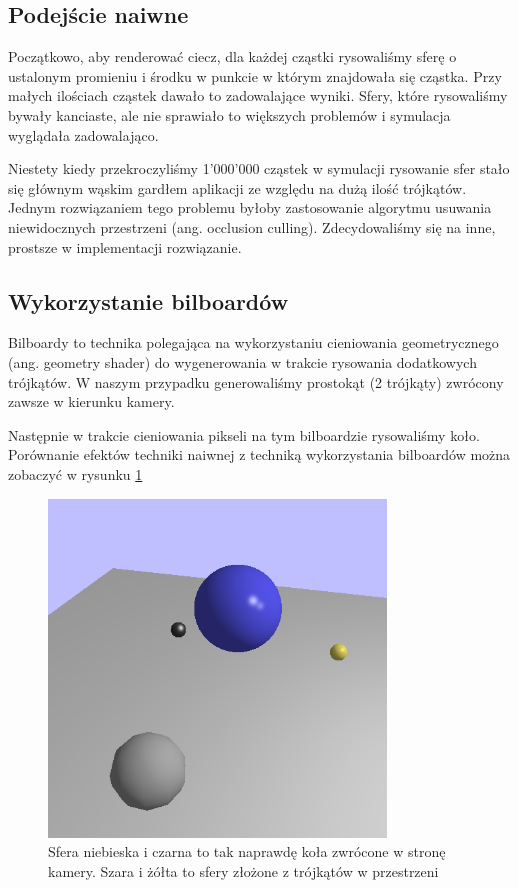 \documentclass[polish, 12pt]{aghthesis}
\begin{document}
	\subsection{Podejście naiwne}
		Początkowo, aby renderować ciecz, dla każdej cząstki rysowaliśmy sferę o ustalonym promieniu i środku w punkcie w którym znajdowała się cząstka. Przy małych ilościach cząstek dawało to zadowalające wyniki. Sfery, które rysowaliśmy bywały kanciaste, ale nie sprawiało to większych problemów i symulacja wyglądała zadowalająco.
		
		Niestety kiedy przekroczyliśmy 1'000'000 cząstek w symulacji rysowanie sfer stało się głównym wąskim gardłem aplikacji ze względu na dużą ilość trójkątów. Jednym rozwiązaniem tego problemu byłoby zastosowanie algorytmu usuwania niewidocznych przestrzeni (ang. occlusion culling). Zdecydowaliśmy się na inne, prostsze w implementacji rozwiązanie.
		
	\subsection{Wykorzystanie bilboardów}
		Bilboardy to technika polegająca na wykorzystaniu cieniowania geometrycznego (ang. geometry shader) do wygenerowania w trakcie rysowania dodatkowych trójkątów. W naszym przypadku generowaliśmy prostokąt (2 trójkąty) zwrócony zawsze w kierunku kamery. 
		
		Następnie w trakcie cieniowania pikseli na tym bilboardzie rysowaliśmy koło. Porównanie efektów techniki naiwnej z techniką wykorzystania bilboardów można zobaczyć w rysunku \ref{fig:impostor_image}
		
		\begin{figure}[h!]
    	\centering
    	\includegraphics[width=0.8\textwidth]{impostor.png}
    	\caption{Sfera niebieska i czarna to tak naprawdę koła zwrócone w stronę kamery. Szara i żółta to sfery złożone z trójkątów w przestrzeni}
    	\label{fig:impostor_image}
		\end{figure}
		
\end{document}
